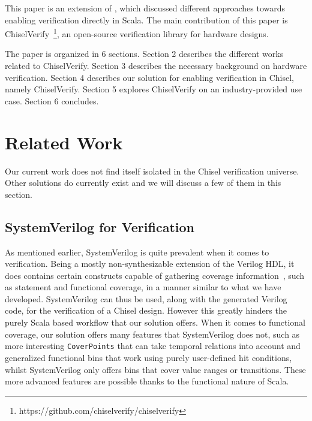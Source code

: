 \documentclass[conference]{IEEEtran}
\newcommand{\todo}[1]{{\color{olive} TODO: #1}}
\begin{document}
This paper is an extension of \cite{verify:chisel:2020}, which discussed different approaches towards enabling verification directly in Scala.
The main contribution of this paper is ChiselVerify~\footnote{https://github.com/chiselverify/chiselverify}, an open-source verification library for hardware designs.

The paper is organized in 6 sections.
Section 2 describes the different works related to ChiselVerify.
Section 3 describes the necessary background on hardware verification.
Section 4 describes our solution for enabling verification in Chisel, namely ChiselVerify.
Section 5 explores ChiselVerify on an industry-provided use case.
Section 6 concludes.

\section{Related Work}

Our current work does not find itself isolated in the Chisel verification universe. Other solutions do currently exist and we will discuss a few of them in this section.  

\subsection{SystemVerilog for Verification}
As mentioned earlier, SystemVerilog is quite prevalent when it comes to verification. Being a mostly non-synthesizable extension of the Verilog HDL, it does contains certain constructs capable of gathering coverage information~\cite{spear2008systemverilog}, such as statement and functional coverage, in a manner similar to what we have developed. SystemVerilog can thus be used, along with the generated Verilog code, for the verification of a Chisel design. However this greatly hinders the purely Scala based workflow that our solution offers. When it comes to functional coverage, our solution offers many features that SystemVerilog does not, such as more interesting \texttt{CoverPoints} that can take temporal relations into account and generalized functional bins that work using purely user-defined hit conditions, whilst SystemVerilog only offers bins that cover value ranges or transitions. These more advanced features are possible thanks to the functional nature of Scala. 
\end{document}
